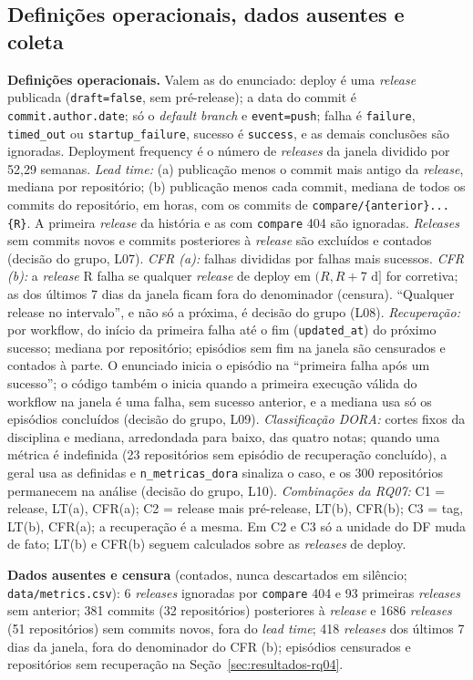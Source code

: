 \subsection{Definições operacionais, dados ausentes e coleta}
\textbf{Definições operacionais.} Valem as do enunciado: deploy é uma \textit{release} publicada
(\texttt{draft=false}, sem pré-release); a data do commit é \texttt{commit.author.date}; só o \textit{default
branch} e \texttt{event=push}; falha é \texttt{failure}, \texttt{timed\_out} ou \texttt{startup\_failure},
sucesso é \texttt{success}, e as demais conclusões são ignoradas. Deployment frequency é o número de
\textit{releases} da janela dividido por 52,29 semanas.
\emph{Lead time:} (a) publicação menos o commit mais antigo da \textit{release}, mediana por repositório;
(b) publicação menos cada commit, mediana de todos os commits do repositório, em horas, com os commits de
\texttt{compare/\{anterior\}...\{R\}}. A primeira \textit{release} da história e as com \texttt{compare} 404
são ignoradas. \textit{Releases} sem commits novos e commits posteriores à \textit{release} são excluídos
e contados (decisão do grupo, L07).
\emph{CFR (a):} falhas divididas por falhas mais sucessos. \emph{CFR (b):} a \textit{release} R falha se
qualquer \textit{release} de deploy em $(R, R{+}7\text{ d}]$ for corretiva; as dos últimos 7 dias da janela
ficam fora do denominador (censura). ``Qualquer release no intervalo'', e não só a próxima, é decisão
do grupo (L08).
\emph{Recuperação:} por workflow, do início da primeira falha até o fim (\texttt{updated\_at}) do próximo
sucesso; mediana por repositório; episódios sem fim na janela são censurados e contados à parte.
O enunciado inicia o episódio na ``primeira falha após um sucesso''; o código também o inicia quando a
primeira execução válida do workflow na janela é uma falha, sem sucesso anterior, e a mediana usa só os
episódios concluídos (decisão do grupo, L09).
\emph{Classificação DORA:} cortes fixos da disciplina e mediana, arredondada para baixo, das quatro notas;
quando uma métrica é indefinida (23 repositórios sem episódio de recuperação concluído), a geral usa as
definidas e \texttt{n\_metricas\_dora} sinaliza o caso, e os 300 repositórios permanecem na análise (decisão do grupo, L10).
\emph{Combinações da RQ07:} C1 = release, LT(a), CFR(a); C2 = release mais pré-release, LT(b), CFR(b);
C3 = tag, LT(b), CFR(a); a recuperação é a mesma. Em C2 e C3 só a unidade do DF muda de fato; LT(b) e CFR(b)
seguem calculados sobre as \textit{releases} de deploy.

\textbf{Dados ausentes e censura} (contados, nunca descartados em silêncio; \texttt{data/metrics.csv}): 6 \textit{releases}
ignoradas por \texttt{compare} 404 e 93 primeiras \textit{releases} sem anterior; 381 commits (32 repositórios)
posteriores à \textit{release} e 1686 \textit{releases} (51 repositórios) sem commits novos, fora do \textit{lead time};
418 \textit{releases} dos últimos 7 dias da janela, fora do denominador do CFR (b); episódios censurados e
repositórios sem recuperação na Seção~\ref{sec:resultados-rq04}.

